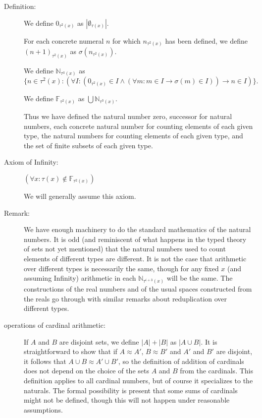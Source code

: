\documentclass[12pt]{article}
\begin{document}
\begin{description}
\item[Definition:]  We define $0_{\tau^2(x)}$ as $|\emptyset_{\tau(x)}|$.  

For each concrete numeral $n$ for which $n_{\tau^2(x)}$ has been defined,
we define $(n+1)_{\tau^2(x)}$ as $\sigma(n_{\tau^2(x)})$.

We define ${\mathbb N}_{\tau^3(x)}$ as $$\{n \in \tau^2(x):(\forall I:(0_{\tau^2(x)} \in I \wedge (\forall m:m \in I \rightarrow \sigma(m) \in I)) \rightarrow n \in I)\}.$$

We define ${\mathbb F}_{\tau^2(x)}$ as $\bigcup {\mathbb N}_{\tau^3(x)}$.

Thus we have defined the natural number zero, successor for natural numbers, each concrete natural number for counting elements of each given type,
the natural numbers for counting elements of each given type, and the set of finite subsets of each given type.

\item[Axiom of Infinity:]  $(\forall x:\tau(x) \not\in {\mathbb F}_{\tau^2(x)})$

We will generally assume this axiom.

\item[Remark:]  We have enough machinery to do the standard mathematics of the natural numbers.  It is odd (and reminiscent of what happens in the typed theory of sets not yet mentioned) that the natural numbers used to count elements of different types are different.  It is not the case that arithmetic over different types is necessarily the same, though for any fixed $x$ (and assuming Infinity) arithmetic in each ${\mathbb N}_{\tau^{i+3}(x)}$ will be the same.  The constructions of the real numbers and of the usual spaces constructed from the reals go through with similar remarks about reduplication over different types.

\item[ operations of cardinal arithmetic:]  If $A$ and $B$ are disjoint sets, we define $|A|+|B|$ as $|A \cup B|$.  It is straightforward to show that if $A \approx A'$, $B \approx B'$ and $A'$ and $B'$ are disjoint, it follows that $A \cup B \approx A' \cup B'$, so the definition of addition of cardinals does not depend on the choice of the sets $A$ and $B$ from the cardinals.
This definition applies to all cardinal numbers, but of course it specializes to the naturals.   The formal possibility is present that some sums of cardinals might not be defined, though this will not happen under reasonable assumptions.


\end{description}
\end{document}
